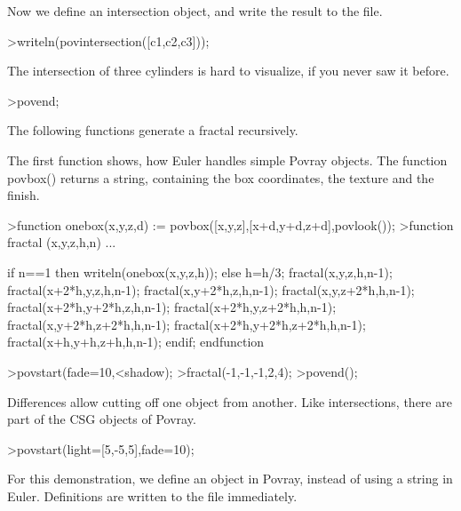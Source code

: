 \documentclass[a4paper,10pt]{article}
\begin{document}
\begin{eulernotebook}
\begin{euleroutput}
\end{euleroutput}
\begin{eulercomment}
Now we define an intersection object, and write the result to the
file.
\end{eulercomment}
\begin{eulerprompt}
>writeln(povintersection([c1,c2,c3]));
\end{eulerprompt}
\begin{eulercomment}
The intersection of three cylinders is hard to visualize, if you never
saw it before.
\end{eulercomment}
\begin{eulerprompt}
>povend;
\end{eulerprompt}
\begin{eulercomment}
The following functions generate a fractal recursively.

The first function shows, how Euler handles simple Povray objects. The
function povbox() returns a string, containing the box coordinates,
the texture and the finish.
\end{eulercomment}
\begin{eulerprompt}
>function onebox(x,y,z,d) := povbox([x,y,z],[x+d,y+d,z+d],povlook());
>function fractal (x,y,z,h,n) ...
\end{eulerprompt}
\begin{eulerudf}
   if n==1 then writeln(onebox(x,y,z,h));
   else
     h=h/3;
     fractal(x,y,z,h,n-1);
     fractal(x+2*h,y,z,h,n-1);
     fractal(x,y+2*h,z,h,n-1);
     fractal(x,y,z+2*h,h,n-1);
     fractal(x+2*h,y+2*h,z,h,n-1);
     fractal(x+2*h,y,z+2*h,h,n-1);
     fractal(x,y+2*h,z+2*h,h,n-1);
     fractal(x+2*h,y+2*h,z+2*h,h,n-1);
     fractal(x+h,y+h,z+h,h,n-1);
   endif;
  endfunction
\end{eulerudf}
\begin{eulerprompt}
>povstart(fade=10,<shadow);
>fractal(-1,-1,-1,2,4);
>povend();
\end{eulerprompt}
\begin{eulercomment}
Differences allow cutting off one object from another. Like
intersections, there are part of the CSG objects of Povray.
\end{eulercomment}
\begin{eulerprompt}
>povstart(light=[5,-5,5],fade=10);
\end{eulerprompt}
\begin{eulercomment}
For this demonstration, we define an object in Povray, instead of
using a string in Euler. Definitions are written to the file
immediately.


\end{eulercomment}
\end{eulernotebook}
\end{document}
